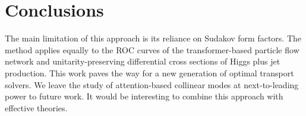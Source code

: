 \section{Conclusions}\label{sec:conclusions}

The main limitation of this approach is its reliance on Sudakov form
factors. The method applies equally to the ROC curves of the
transformer-based particle flow network and unitarity-preserving
differential cross sections of Higgs plus jet production. This work
paves the way for a new generation of optimal transport solvers. We
leave the study of attention-based collinear modes at next-to-leading
power to future work. It would be interesting to combine this approach
with effective theories.

